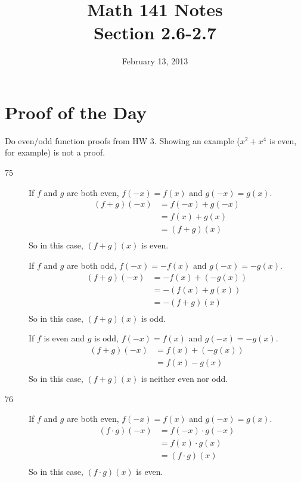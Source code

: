 \documentclass{exam}
\title{Math 141 Notes \\ Section 2.6-2.7}
\date{February 13, 2013}
\begin{document}
\maketitle
\tableofcontents

\section{Proof of the Day}
Do even/odd function proofs from HW 3.  Showing an example ($x^2 + x^4$ is even, for example) is not a proof.

  \begin{description}
    \item[75]
      If $f$ and $g$ are both even, $f(-x) = f(x)$ and $g(-x) = g(x)$.  
      \begin{align*}
        (f + g)(-x) &= f(-x) + g(-x) \\
          &= f(x) + g(x) \\
          &= (f + g)(x) \\
      \end{align*}
      So in this case, $(f + g)(x)$ is even.

      If $f$ and $g$ are both odd, $f(-x) = -f(x)$ and $g(-x) = -g(x)$.  
      \begin{align*}
        (f + g)(-x) &= -f(x) + (-g(x)) \\
          &= - (f(x) + g(x)) \\
          &= -(f + g)(x) \\
      \end{align*}
      So in this case, $(f + g)(x)$ is odd.

      If $f$ is even and $g$ is odd, $f(-x) = f(x)$ and $g(-x) = -g(x)$.  
      \begin{align*}
        (f + g)(-x) &= f(x) + (-g(x)) \\
          &= f(x) - g(x) \\
      \end{align*}
      So in this case, $(f + g)(x)$ is neither even nor odd.

    \item[76]
      If $f$ and $g$ are both even, $f(-x) = f(x)$ and $g(-x) = g(x)$.  
      \begin{align*}
        (f \cdot g)(-x) &= f(-x) \cdot g(-x) \\
          &= f(x) \cdot g(x) \\
          &= (f \cdot g)(x) \\
      \end{align*}
      So in this case, $(f \cdot g)(x)$ is even.


\end{description}
\end{document}
